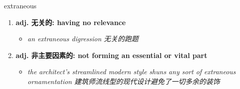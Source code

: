 
\begin{frame}
{\huge extraneous}
\begin{center}
\begin{enumerate}\Large
  \item \textbf{adj. 无关的: having no relevance}
  \begin{itemize}
    \item \em{\Large{an extraneous digression 无关的跑题}}
  \end{itemize}
  \item \textbf{adj. 非主要因素的: not forming an essential or vital part}
  \begin{itemize}
    \item \em{\Large{the architect's streamlined modern style shuns any sort of extraneous ornamentation 建筑师流线型的现代设计避免了一切多余的装饰}}
  \end{itemize}
\end{enumerate}
\end{center}
\end{frame}
